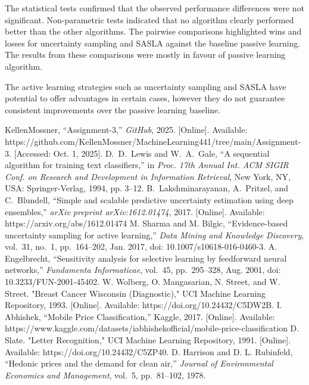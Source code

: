 \documentclass[conference]{IEEEtran}
\begin{document}
	The statistical tests confirmed that the observed performance differences were not significant. Non-parametric tests indicated that no algorithm clearly performed better than the other algorithms. The pairwise comparisons highlighted wins and losses for uncertainty sampling and SASLA against the baseline passive learning. The results from these comparisons were mostly in favour of passive learning algorithm.
	
	The active learning strategies such as uncertainty sampling and SASLA have potential to offer advantages in certain cases, however they do not guarantee consistent improvements over the passive learning baseline.
	
	\begin{thebibliography}{00}
		 KellenMossner, ``Assignment-3,'' \textit{GitHub}, 2025. [Online]. Available: https://github.com/KellenMossner/MachineLearning441/tree/main/Assignment-3. [Accessed: Oct. 1, 2025].
		 D.~D.~Lewis and W.~A.~Gale, ``A sequential algorithm for training text classifiers,'' in \emph{Proc. 17th Annual Int. ACM SIGIR Conf. on Research and Development in Information Retrieval}, New York, NY, USA: Springer-Verlag, 1994, pp. 3--12.
		 B.~Lakshminarayanan, A.~Pritzel, and C.~Blundell, ``Simple and scalable predictive uncertainty estimation using deep ensembles,'' \emph{arXiv preprint arXiv:1612.01474}, 2017. [Online]. Available: https://arxiv.org/abs/1612.01474
		 M. Sharma and M. Bilgic, ``Evidence-based uncertainty sampling for active learning,'' \emph{Data Mining and Knowledge Discovery}, vol.~31, no.~1, pp.~164--202, Jan. 2017, doi: 10.1007/s10618-016-0460-3.
		 A. Engelbrecht, ``Sensitivity analysis for selective learning by feedforward neural networks,'' \emph{Fundamenta Informaticae}, vol.~45, pp.~295--328, Aug. 2001, doi: 10.3233/FUN-2001-45402.
		 W. Wolberg, O. Mangasarian, N. Street, and W. Street. "Breast Cancer Wisconsin (Diagnostic)," UCI Machine Learning Repository, 1993. [Online]. Available: https://doi.org/10.24432/C5DW2B.
		 I. Abhishek, ``Mobile Price Classification,'' Kaggle, 2017. [Online]. Available: https://www.kaggle.com/datasets/iabhishekofficial/mobile-price-classification
		 D. Slate. "Letter Recognition," UCI Machine Learning Repository, 1991. [Online]. Available: https://doi.org/10.24432/C5ZP40.
		 D. Harrison and D. L. Rubinfeld, ``Hedonic prices and the demand for clean air,'' \emph{Journal of Environmental Economics and Management}, vol.~5, pp.~81--102, 1978.

\end{thebibliography}
\end{document}
